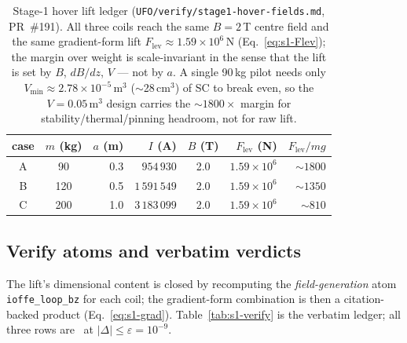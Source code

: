 \begin{table}[h]
\centering
\small
\setlength{\tabcolsep}{5pt}
\begin{tabular}{@{}c c r r c r r@{}}
\toprule
\textbf{case} & \textbf{$m$ (kg)} & \textbf{$a$ (m)} & \textbf{$I$ (A)} & \textbf{$B$ (T)} & \textbf{$F_{\text{lev}}$ (N)} & \textbf{$F_{\text{lev}}/mg$} \\
\midrule
A & 90  & 0.3 & $954\,930$    & 2.0 & $1.59\times10^{6}$ & $\sim\!1800$ \\
B & 120 & 0.5 & $1\,591\,549$ & 2.0 & $1.59\times10^{6}$ & $\sim\!1350$ \\
C & 200 & 1.0 & $3\,183\,099$ & 2.0 & $1.59\times10^{6}$ & $\sim\!810$  \\
\bottomrule
\end{tabular}
\caption{Stage-1 hover lift ledger
(\texttt{UFO/verify/stage1-hover-fields.md}, PR~\#191). All three coils
reach the same $B=2$\,T centre field and the same gradient-form lift
$F_{\text{lev}}\approx1.59\times10^{6}$\,N (Eq.~\eqref{eq:s1-Flev});
the margin over weight is scale-invariant in the sense that the lift is
set by $B$, $dB/dz$, $V$ --- not by $a$. A single 90\,kg pilot needs only
$V_{\min}\approx2.78\times10^{-5}$\,m$^3$ ($\sim$28\,cm$^3$) of SC to
break even, so the $V=0.05$\,m$^3$ design carries the $\sim\!1800\times$
margin for stability/thermal/pinning headroom, not for raw lift.}
\label{tab:s1-lift}
\end{table}

\subsection{Verify atoms and verbatim verdicts}
\label{app:stage1-verify}

The lift's dimensional content is closed by recomputing the
\emph{field-generation} atom \verb|ioffe_loop_bz| for each coil; the
gradient-form combination is then a citation-backed product
(Eq.~\eqref{eq:s1-grad}). Table~\ref{tab:s1-verify} is the verbatim
ledger; all three rows are \tierGreen\ at $|\Delta|\le\varepsilon=10^{-9}$.

